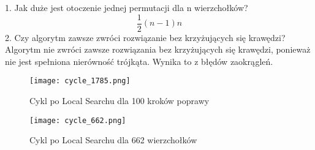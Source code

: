 \documentclass{article}
\begin{document}
\vspace{20pt}
\begin{center}
1. Jak duże jest otoczenie jednej permutacji dla n wierzchołków?
$$ \frac{1}{2}(n-1)n $$
\vspace{10pt}
2. Czy algorytm zawsze zwróci rozwiązanie bez krzyżujących się krawędzi? \\
Algorytm nie zwróci zawsze rozwiązania bez krzyżujących się krawędzi, 
ponieważ nie jest spełniona nierówność trójkąta. Wynika to z błędów zaokrągleń.
\end{center}


\begin{figure}[H] 
\centering
\texttt{[image: cycle\_1785.png]}
\caption{Cykl po Local Searchu dla 100 kroków poprawy}
\label{Newton}
\end{figure}

\begin{figure}[H] 
\centering
\texttt{[image: cycle\_662.png]}
\caption{Cykl po Local Searchu dla 662 wierzchołków}
\label{Newton}
\end{figure}
\end{document}
